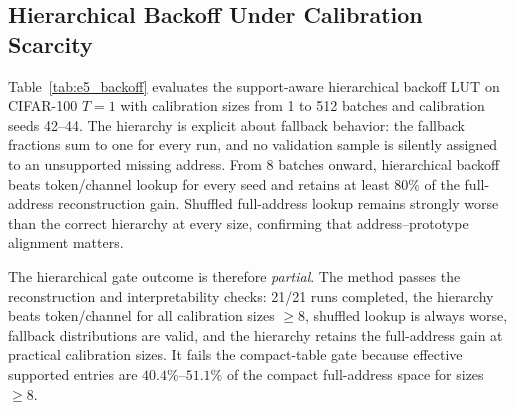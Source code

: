 \subsection{Hierarchical Backoff Under Calibration Scarcity}
\label{sec:e5_results}

Table~\ref{tab:e5_backoff} evaluates the support-aware hierarchical backoff
LUT on CIFAR-100 $T=1$ with calibration sizes from 1 to 512 batches and
calibration seeds 42--44. The hierarchy is explicit about fallback behavior:
the fallback fractions sum to one for every run, and no validation sample is
silently assigned to an unsupported missing address. From 8 batches onward,
hierarchical backoff beats token/channel lookup for every seed and retains at
least $80\%$ of the full-address reconstruction gain. Shuffled full-address
lookup remains strongly worse than the correct hierarchy at every size,
confirming that address--prototype alignment matters.

\begin{table}[t]
\centering
\footnotesize
{}
\caption{E5 hierarchical backoff reconstruction on CIFAR-100 $T=1$. Values are
mean relative MSE reductions in percent over calibration seeds 42--44. Effective
entries are supported hierarchy entries divided by the compact full-address
space; lower is better.}
\label{tab:e5_backoff}
\end{table}

The hierarchical gate outcome is therefore \emph{partial}. The method passes
the reconstruction and interpretability checks: 21/21 runs completed, the
hierarchy beats token/channel for all calibration sizes $\geq 8$, shuffled
lookup is always worse, fallback distributions are valid, and the hierarchy
retains the full-address gain at practical calibration sizes. It fails the
compact-table gate because effective supported entries are $40.4\%$--$51.1\%$
of the compact full-address space for sizes $\geq 8$.

